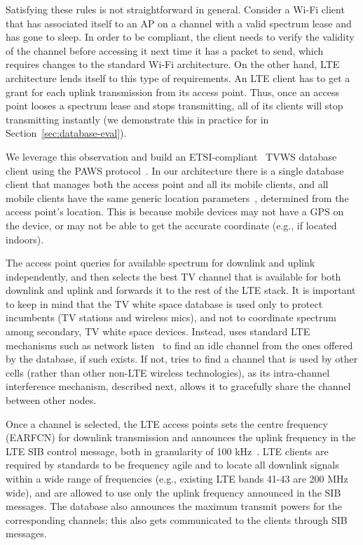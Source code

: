 Satisfying these rules is not straightforward in general. Consider a Wi-Fi client that has associated itself to an AP on a channel with a valid spectrum lease and has gone to sleep. 
In order to be compliant, the client needs to verify the validity of the channel before accessing it next time it has a packet to send, which requires changes to the standard Wi-Fi architecture. 
On the other hand, LTE architecture lends itself to this type of requirements. An LTE client has to get a grant for each uplink transmission from its access point. 
Thus, once an access point looses a spectrum lease and stops transmitting, all of its clients will stop transmitting instantly 
(we demonstrate this in practice for \cf in Section~\ref{sec:database-eval}).


We leverage this observation and build an ETSI-compliant~\cite{etsi_tvws} TVWS database client using the PAWS protocol~\cite{paws}. 
In our architecture there is a single database client that manages both the access point and all its mobile clients, 
and all mobile clients have the same generic location parameters~\cite{etsi_tvws}, determined from the access point's location. 
This is because mobile devices may not have a GPS on the device, or may not be able to get the accurate coordinate (e.g., if located indoors). 

The access point queries for available spectrum for downlink and uplink independently, and then selects the best TV channel that is available for both downlink and uplink and forwards it to the rest of the LTE stack. It is important to keep in mind that the TV white space database is used only to protect incumbents (TV stations and wireless mics), and not to coordinate spectrum among secondary, TV white space devices. 
Instead, \cf uses standard LTE mechanisms such as network listen~\cite{LTEbook} to find an idle channel from the ones offered by the database, if such exists. If not, \cf tries to find a channel that is used by other \cf cells (rather than other non-LTE wireless technologies), as its intra-channel interference mechanism, described next, allows it to gracefully share the channel between other \cf nodes. 

Once a channel is selected, the LTE access points sets the  centre frequency (EARFCN) for downlink transmission and announces the uplink frequency in the LTE SIB control message, both in granularity of 100 kHz~\cite{LTEbullets}. LTE clients are required by standards to be frequency agile and to locate all downlink signals within a wide range of frequencies (e.g., existing LTE bands 41-43 are 200 MHz wide), and are allowed to use only the uplink frequency announced in the SIB messages. 
The database also announces the maximum transmit powers for the corresponding channels; this also gets communicated to the clients through SIB messages. 





